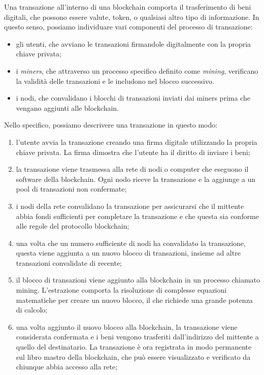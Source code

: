 Una transazione all'interno di una blockchain comporta il trasferimento di beni digitali, che possono essere valute, token, o qualsiasi altro tipo di informazione.
In questo senso, possiamo individuare vari componenti del processo di transazione:
\begin{itemize}
    \item{gli utenti}, che avviano le transazioni firmandole digitalmente con la propria chiave privata;
    \item{i \textit{miners}}, che attraverso un processo specifico definito come \textit{mining}, verificano la validità delle transazioni e le includono nel blocco successivo. 
    \item{i nodi}, che convalidano i blocchi di transazioni inviati dai miners prima che vengano aggiunti alle blockchain.
\end{itemize}

Nello specifico, possiamo descrivere una transazione in questo modo:
\begin{enumerate}
    \item l'utente avvia la transazione creando una firma digitale utilizzando la propria chiave privata. La firma dimostra che l'utente ha il diritto di inviare i beni;
    \item la transazione viene trasmessa alla rete di nodi o computer che eseguono il software della blockchain. Ogni nodo riceve la transazione e la aggiunge a un pool di transazioni non confermate;
    \item i nodi della rete convalidano la transazione per assicurarsi che il mittente abbia fondi sufficienti per completare la transazione e che questa sia conforme alle regole del protocollo blockchain;
    \item una volta che un numero sufficiente di nodi ha convalidato la transazione, questa viene aggiunta a un nuovo blocco di transazioni, insieme ad altre transazioni convalidate di recente;
    \item il blocco di transazioni viene aggiunto alla blockchain in un processo chiamato mining. L'estrazione comporta la risoluzione di complesse equazioni matematiche per creare un nuovo blocco, il che richiede una grande potenza di calcolo;
    \item una volta aggiunto il nuovo blocco alla blockchain, la transazione viene considerata confermata e i beni vengono trasferiti dall'indirizzo del mittente a quello del destinatario. La transazione è ora registrata in modo permanente sul libro mastro della blockchain, che può essere visualizzato e verificato da chiunque abbia accesso alla rete;
\end{enumerate}

